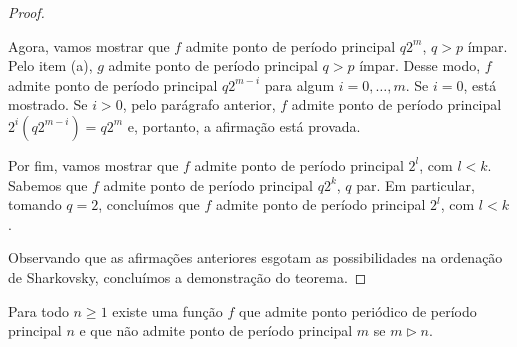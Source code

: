 \begin{proof}
\begin{enumerate}[label = (\alph*)]
Agora, vamos mostrar que $f$ admite ponto de período principal $q2^m$, $q > p$ ímpar. Pelo item (a), $g$ admite ponto de período principal $q > p$ ímpar. Desse modo, $f$ admite ponto de período principal $q2^{m-i}$ para algum $i = 0, \dots, m$. Se $i = 0$, está mostrado. Se $i > 0$, pelo parágrafo anterior, $f$ admite ponto de período principal  $2^i (q2^{m-i}) = q2^m$ e, portanto, a afirmação está provada.

Por fim, vamos mostrar que $f$ admite ponto de período principal $2^l$, com $l < k$. Sabemos que $f$ admite ponto de período principal $q2^k$, $q$ par. Em particular, tomando $q = 2$, concluímos que $f$ admite ponto de período principal $2^l$, com $l < k$.

\end{enumerate}
Observando que as afirmações anteriores esgotam as possibilidades na ordenação de Sharkovsky, concluímos a demonstração do teorema.
\end{proof}

\begin{theorem}
Para todo $n \geq 1$ existe uma função $f$ que admite ponto periódico de período principal $n$ e que não admite ponto de período principal $m$ se $m \triangleright n$.
\end{theorem}

